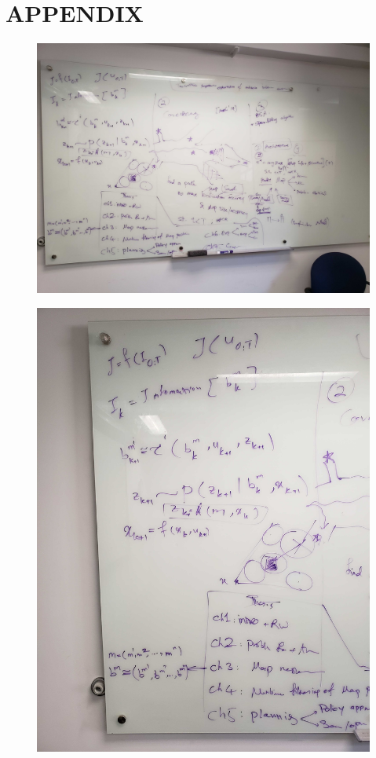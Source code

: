 \documentclass[letterpaper, 10 pt, conference]{ieeeconf}  %
\begin{document}






\section*{APPENDIX}


\clearpage{}
\begin{figure}[H]
  \centering
  \includegraphics[width=.5\textwidth]{figures/whiteboard1.jpg}
  \label{fig:whiteboard1}
\end{figure}

\begin{figure}[H]
  \centering
  \includegraphics[width=.5\textwidth]{figures/whiteboard2.jpg}
  \label{fig:whiteboard1}
\end{figure}
\end{document}
